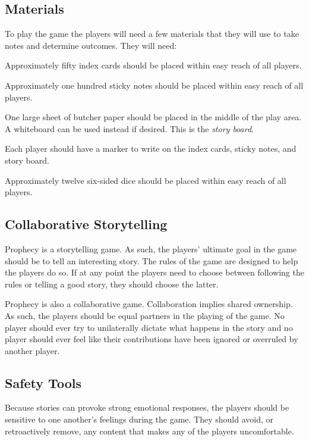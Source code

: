 \documentclass[12pt, a5paper, parskip=half-]{scrartcl}
\begin{document}
\subsection*{Materials} \label{subsection:materials}
To play the game the players will need a few materials that they will use to take notes and determine outcomes. They will need:
\begin{description}[labelindent=0.25cm, leftmargin=\widthof{\hspace{0.25cm}\textbullet\space}, font=\normalfont\textbullet\bfseries\space]
	\item[Index Cards:] Approximately fifty index cards should be placed within easy reach of all players. 
	\item[Sticky Notes:] Approximately one hundred sticky notes should be placed within easy reach of all players.
	\item[Butcher Paper:] One large sheet of butcher paper should be placed in the middle of the play area.  A whiteboard can be used instead if desired. This is the \emph{story board}. 
	\item[Markers:] Each player should have a marker to write on the index cards, sticky notes, and story board.
	\item[Dice:] Approximately twelve six-sided dice should be placed within easy reach of all players. 
\end{description}

\newpage

\subsection*{Collaborative Storytelling} \label{subsection:collaborative-storytelling}
Prophecy is a storytelling game.
As such, the players' ultimate goal in the game should be to tell an interesting story.
The rules of the game are designed to help the players do so.
If at any point the players need to choose between following the rules or telling a good story, they should choose the latter.

Prophecy is also a collaborative game.
Collaboration implies shared ownership.
As such, the players should be equal partners in the playing of the game.
No player should ever try to unilaterally dictate what happens in the story and no player should ever feel like their contributions have been ignored or overruled by another player.

\subsection*{Safety Tools} \label{subsection:safety-tools}
Because stories can provoke strong emotional responses, the players should be sensitive to one another's feelings during the game.
They should avoid, or retroactively remove, any content that makes any of the players uncomfortable.
\end{document}

